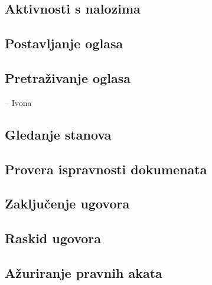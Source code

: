 \documentclass{article}
\begin{document}
\subsection{\bfseries Aktivnosti s nalozima}

\newpage
\subsection{\bfseries Postavljanje oglasa}

\newpage
\subsection{\bfseries Pretra\v{z}ivanje oglasa}
-- Ivona

\newpage
\subsection{\bfseries Gledanje stanova}

\newpage
\subsection{\bfseries Provera ispravnosti dokumenata}

\newpage
\subsection{\bfseries Zaklju\v{c}enje ugovora}

\newpage
\subsection{\bfseries Raskid ugovora}

\newpage
\subsection{\bfseries A\v{z}uriranje pravnih akata}
\end{document}
